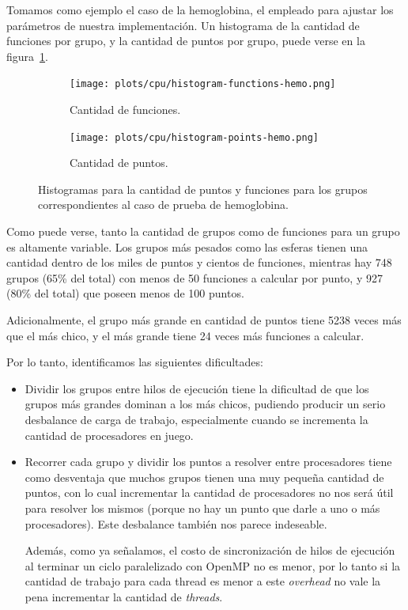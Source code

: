 Tomamos como ejemplo el caso de la hemoglobina, el empleado para ajustar los
par\'ametros de nuestra implementaci\'on. Un histograma de la cantidad de
funciones por grupo, y la cantidad de puntos por grupo, puede verse en la
figura~\ref{fig:lio-histo-groups}.

\begin{figure}[htbp]
   \centering
   \begin{subfigure}[b]{\plotwidthtres}
     \texttt{[image: plots/cpu/histogram-functions-hemo.png]}
     \caption{Cantidad de funciones.}
   \end{subfigure}
   \begin{subfigure}[b]{\plotwidthtres}
     \texttt{[image: plots/cpu/histogram-points-hemo.png]}
     \caption{Cantidad de puntos.}
   \end{subfigure}
   \caption{Histogramas para la cantidad de puntos y funciones para los grupos correspondientes al caso de prueba
   de hemoglobina.}
   \label{fig:lio-histo-groups}
\end{figure}

Como puede verse, tanto la cantidad de grupos como de funciones para un grupo es altamente
variable. Los grupos m\'as pesados como las esferas tienen una cantidad dentro de los
miles de puntos y cientos de funciones, mientras hay 748 grupos (65\%
del total) con menos de 50 funciones a calcular por punto, y 927 (80\% del total)
que poseen menos de 100 puntos.

Adicionalmente, el grupo m\'as grande en cantidad de puntos tiene 5238 veces m\'as
que el m\'as chico, y el m\'as grande tiene 24 veces m\'as funciones a calcular.

Por lo tanto, identificamos las siguientes dificultades:

\begin{itemize}
    \item Dividir los grupos entre hilos de ejecuci\'on tiene la dificultad de que
    los grupos m\'as grandes dominan a los m\'as chicos, pudiendo producir un serio
    desbalance de carga de trabajo, especialmente cuando se incrementa la cantidad de
    procesadores en juego.

    \item Recorrer cada grupo y dividir los puntos a resolver entre procesadores
    tiene como desventaja que muchos grupos tienen una muy peque\~na cantidad de
    puntos, con lo cual incrementar la cantidad de procesadores no nos ser\'a \'util
    para resolver los mismos (porque no hay un punto que darle a uno o m\'as procesadores).
    Este desbalance tambi\'en nos parece indeseable.

    Adem\'as, como ya se\~nalamos, el costo de sincronizaci\'on de hilos de
    ejecuci\'on al terminar un ciclo paralelizado con OpenMP no es menor, por
    lo tanto si la cantidad de trabajo para cada thread es menor a este
    \textit{overhead} no vale la pena incrementar la cantidad de \textit{threads}.
\end{itemize}

